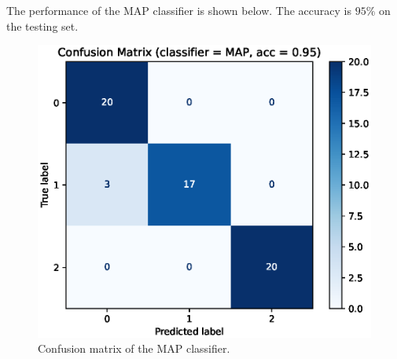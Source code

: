 The performance of the MAP classifier is shown below. The accuracy is $95\%$ on the testing set.
    \begin{figure}[H]
        \centering
        \includegraphics[scale=1.0]{cm_MAP.eps}
        \caption{Confusion matrix of the MAP classifier.}
        \label{fig:cm_map}
    \end{figure}